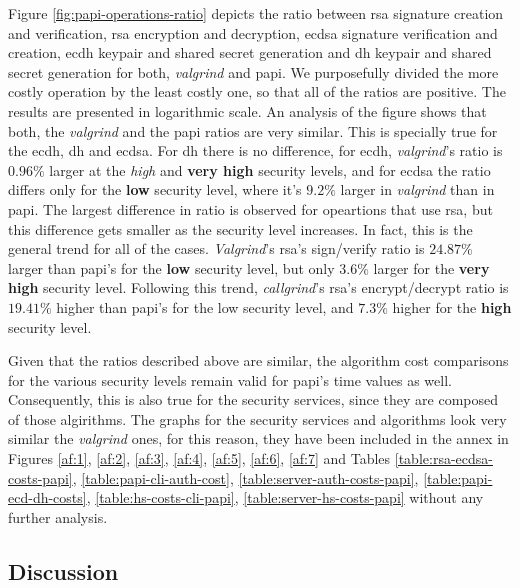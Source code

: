 Figure \ref{fig:papi-operations-ratio} depicts the ratio between \gls{rsa} signature creation and verification, \gls{rsa}
encryption and decryption, \gls{ecdsa} signature verification and creation, \gls{ecdh} keypair and shared secret generation and
\gls{dh} keypair and shared secret generation for both, \textit{valgrind} and \gls{papi}. We purposefully divided the more
costly operation by the least costly one, so that all of the ratios are positive. The results are presented in logarithmic scale. An analysis of the figure shows that
both, the \textit{valgrind} and the \gls{papi} ratios are very similar. This is specially true for the \gls{ecdh}, \gls{dh}
and \gls{ecdsa}. For \gls{dh} there is no difference, for \gls{ecdh}, \textit{valgrind}'s ratio is $0.96\%$ larger at the \textit{high} and
\textbf{very high} security levels, and for \gls{ecdsa} the ratio differs only for the \textbf{low} 
security level, where it's $9.2\%$ larger in \textit{valgrind} than in \gls{papi}. The largest difference in ratio
is observed for opeartions that use \gls{rsa}, but this difference gets smaller as the security level increases. In fact,
this is the general trend for all of the cases. \textit{Valgrind}'s \gls{rsa}'s sign/verify ratio is $24.87\%$ larger than \gls{papi}'s
for the \textbf{low} security level, but only $3.6\%$ larger for the \textbf{very high} security level. Following this trend, 
\textit{callgrind}'s \gls{rsa}'s encrypt/decrypt ratio is $19.41\%$ higher
than \gls{papi}'s for the low security level, and $7.3\%$ higher for the \textbf{high} security level.

Given that the ratios described above are similar, the algorithm cost comparisons for the various security levels remain valid for \gls{papi}'s time values as well.
Consequently, this is also true for the security services, since they are composed of those algirithms. The graphs for the security services and algorithms look very similar
the \textit{valgrind} ones, for this reason, they have been included in the annex in Figures \ref{af:1}, \ref{af:2}, \ref{af:3}, \ref{af:4}, 
\ref{af:5}, \ref{af:6}, \ref{af:7} and Tables \ref{table:rsa-ecdsa-costs-papi}, \ref{table:papi-cli-auth-cost}, \ref{table:server-auth-costs-papi},
\ref{table:papi-ecd-dh-costs}, \ref{table:hs-costs-cli-papi}, \ref{table:server-hs-costs-papi} without any further analysis.

\subsection{Discussion} \label{sec:ss-cost-conclusions}


